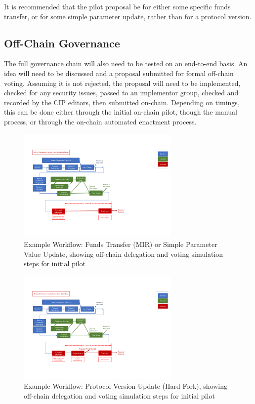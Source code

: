 It is recommended that the pilot proposal be for either some specific funds transfer, or for some simple parameter update, rather than for a protocol version.

\subsection{Off-Chain Governance}

The full governance chain will also need to be tested on an end-to-end basis.  An idea will need to be discussed and a proposal submitted for formal off-chain voting.  Assuming it is not rejected,
the proposal will need to be implemented, checked for any security issues, passed to an implementor group, checked and recorded by the CIP editors, then submitted on-chain.
Depending on timings, this can be done either through the initial on-chain pilot, though the manual process, or through the on-chain automated enactment process.

\begin{figure}
  \includegraphics[angle=270,trim=0 90 0 90,clip,width=0.7\textwidth]{Workflow3}
  \caption{Example Workflow: Funds Transfer (MIR) or Simple Parameter Value Update, showing off-chain delegation and voting simulation steps for initial pilot}
  \label{fig:workflow-mir2}
\end{figure}

\begin{figure}
  \includegraphics[angle=270,trim=0 90 0 90,clip,width=0.7\textwidth]{Workflow4}
  \caption{Example Workflow: Protocol Version Update (Hard Fork), showing off-chain delegation and voting simulation steps for initial pilot}
  \label{fig:workflow-hf2}
\end{figure}

